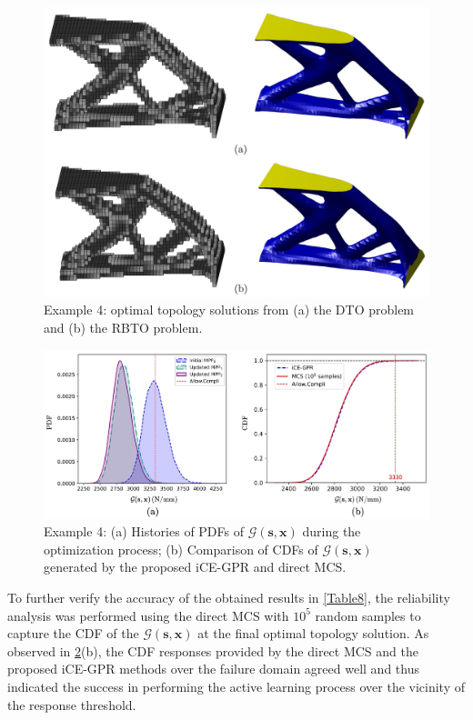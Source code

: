 \documentclass[preprint,3p]{elsarticle}
\begin{document}
\begin{linenumbers}
\begin{figure}[t]
	\begin{center}
		\includegraphics[scale=0.6]{Fig15.jpg}
	\end{center}
	\caption{Example 4: optimal topology solutions from (a) the DTO problem and (b) the RBTO problem.}
	\label{FIG:15}
\end{figure}

\begin{figure}[t!]
	\begin{center}
		\includegraphics[scale=1.185]{Fig16.jpg}
	\end{center}
	\caption{Example 4: (a) Histories of PDFs of $\mathcal{G}(\textbf{s},\textbf{x})$ during the optimization process; (b) Comparison of CDFs of $\mathcal{G}(\textbf{s},\textbf{x})$ generated by the proposed iCE-GPR and direct MCS.}
	\label{FIG:16}
\end{figure}

To further verify the accuracy of the obtained results in \cref{Table8}, the reliability analysis was performed using the direct MCS with $10^5$ random samples to capture the CDF of the $\mathcal{G}(\textbf{s},\textbf{x})$ at the final optimal topology solution. As observed in \cref{FIG:16}(b), the CDF responses provided by the direct MCS and the proposed iCE-GPR methods over the failure domain agreed well and thus indicated the success in performing the active learning process over the vicinity of the response threshold. 


\end{linenumbers}
\end{document}

